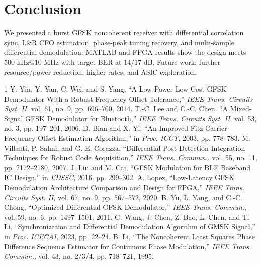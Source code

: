 \documentclass[journal]{IEEEtran}
\begin{document}
\section{Conclusion}
We presented a burst GFSK noncoherent receiver with differential correlation sync, L\&R CFO estimation, phase-peak timing recovery, and multi-sample differential demodulation. MATLAB and FPGA results show the design meets 500 kHz@10 MHz with target BER at 14/17 dB. Future work: further resource/power reduction, higher rates, and ASIC exploration.

\begin{thebibliography}{1}
    Y. Yin, Y. Yan, C. Wei, and S. Yang, ``A Low-Power Low-Cost GFSK Demodulator With a Robust Frequency Offset Tolerance,'' \textit{IEEE Trans. Circuits Syst. II}, vol. 61, no. 9, pp. 696--700, 2014.
    T.-C. Lee and C.-C. Chen, ``A Mixed-Signal GFSK Demodulator for Bluetooth,'' \textit{IEEE Trans. Circuits Syst. II}, vol. 53, no. 3, pp. 197--201, 2006.
    D. Bian and X. Yi, ``An Improved Fitz Carrier Frequency Offset Estimation Algorithm,'' in \textit{Proc. ICCT}, 2003, pp. 778--783.
    M. Villanti, P. Salmi, and G. E. Corazza, ``Differential Post Detection Integration Techniques for Robust Code Acquisition,'' \textit{IEEE Trans. Commun.}, vol. 55, no. 11, pp. 2172--2180, 2007.
    J. Liu and M. Cai, ``GFSK Modulation for BLE Baseband IC Design,'' in \textit{EDSSC}, 2016, pp. 299--302.
    A. Lopez, ``Low-Latency GFSK Demodulation Architecture Comparison and Design for FPGA,'' \textit{IEEE Trans. Circuits Syst. II}, vol. 67, no. 9, pp. 567--572, 2020.
    B. Yu, L. Yang, and C.-C. Chong, ``Optimized Differential GFSK Demodulator,'' \textit{IEEE Trans. Commun.}, vol. 59, no. 6, pp. 1497--1501, 2011.
    G. Wang, J. Chen, Z. Bao, L. Chen, and T. Li, ``Synchronization and Differential Demodulation Algorithm of GMSK Signal,'' in \textit{Proc. ICECAI}, 2023, pp. 22--24.
    B. Li, ``The Noncoherent Least Squares Phase Difference Sequence Estimator for Continuous Phase Modulation,'' \textit{IEEE Trans. Commun.}, vol. 43, no. 2/3/4, pp. 718--721, 1995.
\end{thebibliography}
\end{document}
